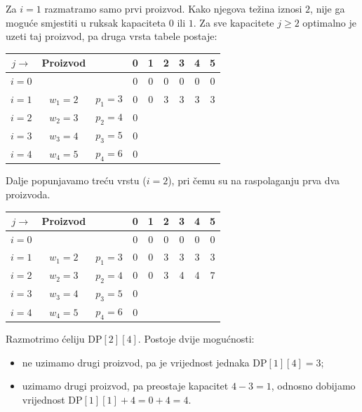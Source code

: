 \medskip

Za $i=1$ razmatramo samo prvi proizvod. Kako njegova težina iznosi $2$, nije ga moguće smjestiti u ruksak kapaciteta $0$ ili $1$. Za sve kapacitete $j\geq 2$ optimalno je uzeti taj proizvod, pa druga vrsta tabele postaje:

\begin{table}[H]
	\centering
	\begin{tabular}{|c|cc|cccccc|}\hline
		$j\rightarrow$ & Proizvod & & 0 & 1 & 2 & 3 & 4 & 5 \\ \hline
		$i=0$ & & & 0 & 0 & 0 & 0 & 0 & 0 \\
		$i=1$ & $w_1=2$ & $p_1=3$ & 0 & 0 & 3 & 3 & 3 & 3 \\
		$i=2$ & $w_2=3$ & $p_2=4$ & 0 & & & & & \\
		$i=3$ & $w_3=4$ & $p_3=5$ & 0 & & & & & \\
		$i=4$ & $w_4=5$ & $p_4=6$ & 0 & & & & & \\ \hline
	\end{tabular}
\end{table}

\medskip

Dalje popunjavamo treću vrstu ($i=2$), pri čemu su na raspolaganju prva dva proizvoda.

\begin{table}[H]
	\centering
	\begin{tabular}{|c|cc|cccccc|}\hline
		$j\rightarrow$ & Proizvod & & 0 & 1 & 2 & 3 & 4 & 5 \\ \hline
		$i=0$ & & & 0 & 0 & 0 & 0 & 0 & 0 \\
		$i=1$ & $w_1=2$ & $p_1=3$ & 0 & 0 & 3 & 3 & 3 & 3 \\
		$i=2$ & $w_2=3$ & $p_2=4$ & 0 & 0 & 3 & 4 & 4 & 7 \\
		$i=3$ & $w_3=4$ & $p_3=5$ & 0 & & & & & \\
		$i=4$ & $w_4=5$ & $p_4=6$ & 0 & & & & & \\ \hline
	\end{tabular}
\end{table}

Razmotrimo ćeliju $\textrm{DP}[2][4]$. Postoje dvije mogućnosti:

\begin{itemize}
	\item ne uzimamo drugi proizvod, pa je vrijednost jednaka $\textrm{DP}[1][4]=3$;
	\item uzimamo drugi proizvod, pa preostaje kapacitet $4-3=1$, odnosno dobijamo vrijednost $\textrm{DP}[1][1]+4=0+4=4.$
\end{itemize}


